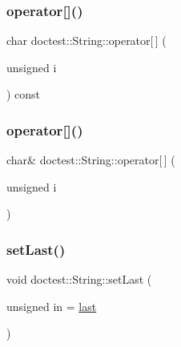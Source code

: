\mbox{\label{classdoctest_1_1String_adf69290bc23e8c7bf60a9bcf765ebc10}} 
\subsubsection{\texorpdfstring{operator[]()}{operator[]()}\hspace{0.1cm}{\footnotesize\ttfamily [1/2]}}
{\footnotesize\ttfamily char doctest\+::\+String\+::operator\mbox{[}$\,$\mbox{]} (\begin{DoxyParamCaption}\item[{unsigned}]{i }\end{DoxyParamCaption}) const}

\mbox{\label{classdoctest_1_1String_acd37c72485c1277fc673f6b328138b40}} 
\subsubsection{\texorpdfstring{operator[]()}{operator[]()}\hspace{0.1cm}{\footnotesize\ttfamily [2/2]}}
{\footnotesize\ttfamily char\& doctest\+::\+String\+::operator\mbox{[}$\,$\mbox{]} (\begin{DoxyParamCaption}\item[{unsigned}]{i }\end{DoxyParamCaption})}

\mbox{\label{classdoctest_1_1String_a801d3d8ba364be7e05f0e27447521b8b}} 
\subsubsection{\texorpdfstring{set\+Last()}{setLast()}}
{\footnotesize\ttfamily void doctest\+::\+String\+::set\+Last (\begin{DoxyParamCaption}\item[{unsigned}]{in = {\ttfamily \hyperlink{classdoctest_1_1String_a7e34a25b9fed27da2b69f75449ca510c}{last}} }\end{DoxyParamCaption})\hspace{0.3cm}{\ttfamily [private]}}

